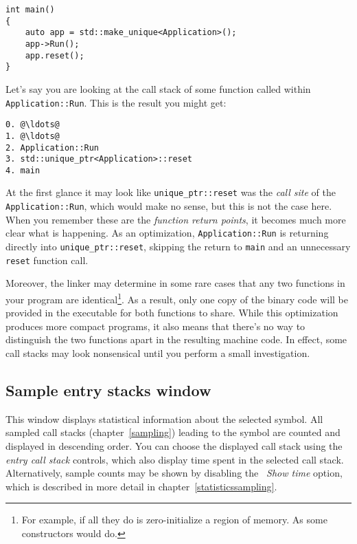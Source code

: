 \documentclass[hidelinks,titlepage,a4paper,twoside]{article}
\begin{document}
\begin{lstlisting}
int main()
{
    auto app = std::make_unique<Application>();
    app->Run();
    app.reset();
}
\end{lstlisting}

Let's say you are looking at the call stack of some function called within \texttt{Application::Run}. This is the result you might get:

\begin{lstlisting}
0. @\ldots@
1. @\ldots@
2. Application::Run
3. std::unique_ptr<Application>::reset
4. main
\end{lstlisting}

At the first glance it may look like \texttt{unique\_ptr::reset} was the \emph{call site} of the \texttt{Application::Run}, which would make no sense, but this is not the case here. When you remember these are the \emph{function return points}, it becomes much more clear what is happening. As an optimization, \texttt{Application::Run} is returning directly into \texttt{unique\_ptr::reset}, skipping the return to \texttt{main} and an unnecessary \texttt{reset} function call.

Moreover, the linker may determine in some rare cases that any two functions in your program are identical\footnote{For example, if all they do is zero-initialize a region of memory. As some constructors would do.}. As a result, only one copy of the binary code will be provided in the executable for both functions to share. While this optimization produces more compact programs, it also means that there's no way to distinguish the two functions apart in the resulting machine code. In effect, some call stacks may look nonsensical until you perform a small investigation.

\subsection{Sample entry stacks window}
\label{sampleparents}

This window displays statistical information about the selected symbol. All sampled call stacks (chapter~\ref{sampling}) leading to the symbol are counted and displayed in descending order. You can choose the displayed call stack using the \emph{entry call stack} controls, which also display time spent in the selected call stack. Alternatively, sample counts may be shown by disabling the \emph{\faStopwatch{}~Show time} option, which is described in more detail in chapter~\ref{statisticssampling}.
\end{document}
